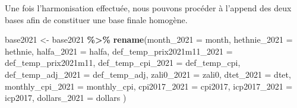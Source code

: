 \documentclass[
]{article}
\newenvironment{Shaded}{\begin{snugshade}}{\end{snugshade}}
\newcommand{\AttributeTok}[1]{\textcolor[rgb]{0.13,0.29,0.53}{#1}}
\newcommand{\FunctionTok}[1]{\textcolor[rgb]{0.13,0.29,0.53}{\textbf{#1}}}
\newcommand{\NormalTok}[1]{#1}
\newcommand{\OtherTok}[1]{\textcolor[rgb]{0.56,0.35,0.01}{#1}}
\newcommand{\SpecialCharTok}[1]{\textcolor[rgb]{0.81,0.36,0.00}{\textbf{#1}}}
\begin{document}
Une fois l'harmonisation effectuée, nous pouvons procéder à l'append des
deux bases afin de constituer une base finale homogène.

\begin{Shaded}
\begin{Highlighting}[]
\NormalTok{base2021 }\OtherTok{\textless{}{-}}\NormalTok{ base2021 }\SpecialCharTok{\%\textgreater{}\%} 
  \FunctionTok{rename}\NormalTok{(}\AttributeTok{month\_2021 =}\NormalTok{ month,}
         \AttributeTok{hethnie\_2021 =}\NormalTok{ hethnie,}
         \AttributeTok{halfa\_2021 =}\NormalTok{ halfa,}
         \AttributeTok{def\_temp\_prix2021m11\_2021 =}\NormalTok{ def\_temp\_prix2021m11,}
         \AttributeTok{def\_temp\_cpi\_2021 =}\NormalTok{ def\_temp\_cpi,}
         \AttributeTok{def\_temp\_adj\_2021 =}\NormalTok{ def\_temp\_adj,}
         \AttributeTok{zali0\_2021 =}\NormalTok{ zali0,}
         \AttributeTok{dtet\_2021 =}\NormalTok{ dtet,}
         \AttributeTok{monthly\_cpi\_2021 =}\NormalTok{ monthly\_cpi,}
         \AttributeTok{cpi2017\_2021 =}\NormalTok{ cpi2017,}
         \AttributeTok{icp2017\_2021 =}\NormalTok{ icp2017,}
         \AttributeTok{dollars\_2021 =}\NormalTok{ dollars}
\NormalTok{         )}
\end{Highlighting}
\end{Shaded}
\end{document}
